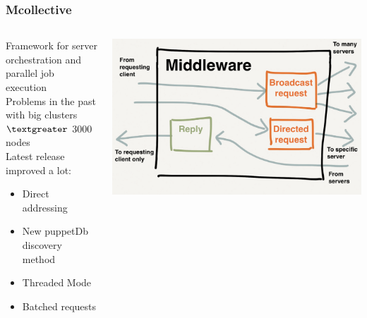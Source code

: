 \documentclass[aspectratio=169]{beamer}
\begin{document}
\begin{frame}
    \frametitle{Mcollective}
    \begin{minipage}[T]{0.95\textwidth}
        \begin{columns}
            \begin{column}{0.5\textwidth}
                Framework for server orchestration and parallel job execution \\[2em]

                Problems in the past with big clusters \\
                $\textgreater$ 3000 nodes \\[2em]

                Latest release improved a lot:
                \begin{itemize}                
                    \item Direct addressing
                    \item New puppetDb discovery method
                    \item Threaded Mode
                    \item Batched requests
                \end{itemize}
            \end{column}
            \begin{column}{0.5\textwidth}
            \includegraphics[width=1.1\textwidth]{mco.png}
            \end{column}
        \end{columns}
   \end{minipage} 
\end{frame}

\end{document}
